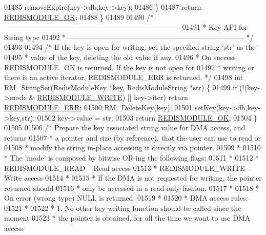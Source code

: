 \begin{DoxyCode}
{{{01485         removeExpire(key->db,key->key);
01486     \}
01487     \textcolor{keywordflow}{return} \hyperlink{redismodule_8h_a1bc5bfd69abcd378ff52c640adc5418d}{REDISMODULE\_OK};
01488 \}
01489 
01490 \textcolor{comment}{/* --------------------------------------------------------------------------}
01491 \textcolor{comment}{ * Key API for String type}
01492 \textcolor{comment}{ * -------------------------------------------------------------------------- */}
01493 
01494 \textcolor{comment}{/* If the key is open for writing, set the specified string 'str' as the}
01495 \textcolor{comment}{ * value of the key, deleting the old value if any.}
01496 \textcolor{comment}{ * On success REDISMODULE\_OK is returned. If the key is not open for}
01497 \textcolor{comment}{ * writing or there is an active iterator, REDISMODULE\_ERR is returned. */}
01498 \textcolor{keywordtype}{int} RM\_StringSet(RedisModuleKey *key, RedisModuleString *str) \{
01499     \textcolor{keywordflow}{if} (!(key->mode & \hyperlink{redismodule_8h_a73b37117ef94cb4a904361afcc51b6b4}{REDISMODULE\_WRITE}) || key->iter) \textcolor{keywordflow}{return} 
      \hyperlink{redismodule_8h_a3df6f5bd5247289e66f44437a7cddd49}{REDISMODULE\_ERR};
01500     RM\_DeleteKey(key);
01501     setKey(key->db,key->key,str);
01502     key->value = str;
01503     \textcolor{keywordflow}{return} \hyperlink{redismodule_8h_a1bc5bfd69abcd378ff52c640adc5418d}{REDISMODULE\_OK};
01504 \}
01505 
01506 \textcolor{comment}{/* Prepare the key associated string value for DMA access, and returns}
01507 \textcolor{comment}{ * a pointer and size (by reference), that the user can use to read or}
01508 \textcolor{comment}{ * modify the string in-place accessing it directly via pointer.}
01509 \textcolor{comment}{ *}
01510 \textcolor{comment}{ * The 'mode' is composed by bitwise OR-ing the following flags:}
01511 \textcolor{comment}{ *}
01512 \textcolor{comment}{ *     REDISMODULE\_READ -- Read access}
01513 \textcolor{comment}{ *     REDISMODULE\_WRITE -- Write access}
01514 \textcolor{comment}{ *}
01515 \textcolor{comment}{ * If the DMA is not requested for writing, the pointer returned should}
01516 \textcolor{comment}{ * only be accessed in a read-only fashion.}
01517 \textcolor{comment}{ *}
01518 \textcolor{comment}{ * On error (wrong type) NULL is returned.}
01519 \textcolor{comment}{ *}
01520 \textcolor{comment}{ * DMA access rules:}
01521 \textcolor{comment}{ *}
01522 \textcolor{comment}{ * 1. No other key writing function should be called since the moment}
01523 \textcolor{comment}{ * the pointer is obtained, for all the time we want to use DMA access}
}}}
\end{DoxyCode}
